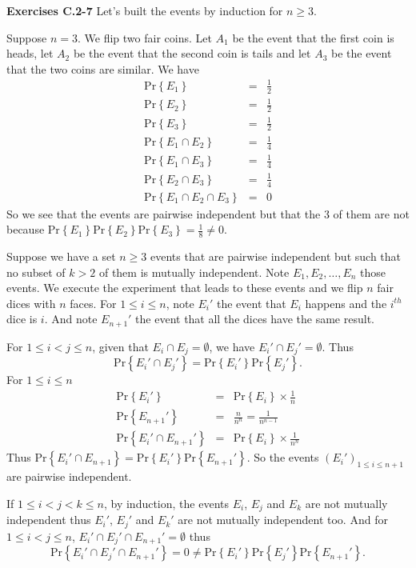 \documentclass[a4paper,12pt]{article}
\newcommand{\newpar}[1]
{\bigskip \noindent \textbf{Exercises #1} \newline}
\newcommand{\prob}[1]{\mathrm{Pr}\left\{ #1 \right\}}
\begin{document}
\newpar{C.2-7}
Let's built the events by induction for $n\ge 3$.

Suppose $n=3$.  We flip two fair coins.  Let $A_1$ be the event
that the first coin is heads, let $A_2$ be the event that the second
coin is tails and let $A_3$ be the event that the two coins are
similar.  We have
\begin{eqnarray*}
  \prob{E_1} &=& \frac{1}{2} \\
  \prob{E_2} &=& \frac{1}{2} \\
  \prob{E_3} &=& \frac{1}{2} \\
  \prob{E_1 \cap E_2} &=& \frac{1}{4} \\
  \prob{E_1 \cap E_3} &=& \frac{1}{4} \\
  \prob{E_2 \cap E_3} &=& \frac{1}{4} \\
  \prob{E_1 \cap E_2 \cap E_3} &=& 0
\end{eqnarray*}
So we see that the events are pairwise independent but that the 3 of
them are not because $\prob{E_1}\prob{E_2}\prob{E_3} = \frac{1}{8}
\not= 0$.

\medskip
Suppose we have a set $n \ge 3$ events that are pairwise independent
but such that no subset of $k > 2$ of them is mutually independent.
Note $E_1, E_2, \ldots, E_n$ those events.  We execute the experiment
that leads to these events and we flip $n$ fair dices with $n$
faces. For $1\le i\le n$, note $E_i'$ the event that $E_i$ happens and
the $i^{th}$ dice is $i$.  And note $E_{n+1}'$ the event that all the
dices have the same result.

For $1\le i<j\le n$, given that $E_i \cap E_j = \emptyset$,  we have
$E_i'\cap E_j' = \emptyset$.  Thus
\[ \prob{E_i'\cap E_j'} = \prob{E_i'}\prob{E_j'}.\]
For $1\le i\le n$
\begin{eqnarray*}
  \prob{E_i'} &=& \prob{E_i} \times \frac{1}{n} \\
  \prob{E_{n+1}'} &=& \frac{n}{n^n} = \frac{1}{n^{n-1}} \\
  \prob{E_i' \cap E_{n+1}'} &=& \prob{E_i} \times \frac{1}{n^n}
\end{eqnarray*}
Thus $\prob{E_i' \cap E_{n+1}} = \prob{E_i'} \prob{E_{n+1}'}$.   So
the events $(E_i')_{1\le i\le n+1}$ are pairwise independent.

If $1\le i<j<k\le n$, by induction, the events $E_i$, $E_j$ and $E_k$ are not
mutually independent thus $E_i'$, $E_j'$ and $E_k'$ are not mutually
independent too.  And for $1\le i<j\le n$, $E_i' \cap E_j' \cap
E_{n+1}' = \emptyset$ thus
\[\prob{E_i' \cap E_j' \cap E_{n+1}'} = 0 \not=
\prob{E_i'}\prob{E_j'}\prob{E_{n+1}'}.\]
\end{document}
